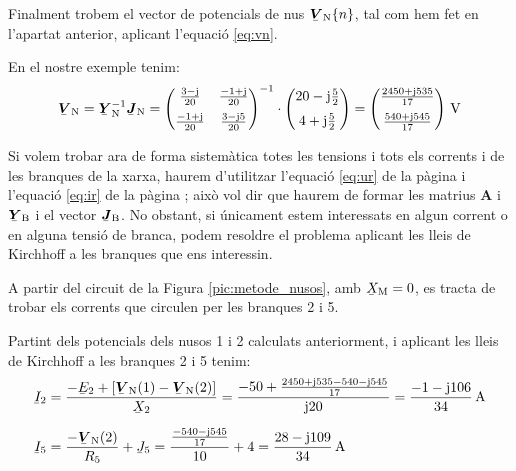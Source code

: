 Finalment
trobem el vector de potencials de nus $\mcmplx{V}\ped{N}\{n\}$, tal
com  hem fet en l'apartat anterior, aplicant l'equació \eqref{eq:vn}.

En el nostre exemple tenim:
\[
   \mcmplx{V}\ped{N} = \mcmplx{Y}\ped{N}^{-1} \mcmplx{J}\ped{N} =
   \begin{pmatrix}
         \frac{3 - \ju}{20}  & \frac{-1 + \ju}{20} \\[2mm]
         \frac{-1 + \ju}{20} & \frac{3 - \ju 5}{20}
   \end{pmatrix} ^{-1} \cdot
   \begin{pmatrix}
            20 - \ju \frac{5}{2} \\[2mm]
            4 + \ju \frac{5}{2}
   \end{pmatrix} =
   \begin{pmatrix}
         \frac{2450 + \ju 535}{17} \\[2mm]
         \frac{540  + \ju 545}{17}
   \end{pmatrix}\unit{V}
\]

Si volem trobar ara de forma sistemàtica totes les tensions i tots
els corrents i  de les branques de la xarxa, haurem d'utilitzar
l'equació \eqref{eq:ur} de la pàgina \pageref{eq:ur} i l'equació
\eqref{eq:ir} de la pàgina \pageref{eq:ir}; això vol dir que haurem
de formar les matrius $\boldsymbol{A}$ i $\mcmplx{Y}\ped{B}$ i el
vector $\mcmplx{J}\ped{B}$. No obstant, si únicament estem
interessats en algun corrent o en alguna tensió de branca, podem
resoldre el problema aplicant les lleis de Kirchhoff a les branques
que ens interessin.


\begin{exemple}
    A partir del circuit de la Figura \vref{pic:metode_nusos}, amb
    $\cmplx{X}\ped{M}=0$, es tracta de trobar els corrents que circulen
    per les branques 2 i 5.

    Partint dels potencials dels nusos 1 i 2 calculats anteriorment, i
    aplicant les lleis de Kirchhoff a les branques 2 i 5 tenim:
    \begin{align*}
       \cmplx{I}_2 &= \frac{-\cmplx{E}_2 + [\mcmplx{V}\ped{N}(1) - \mcmplx{V}\ped{N}(2)]}
                      {\cmplx{X}_2} = \frac{-50 + \frac{2450+\ju 535 -540
                      - \ju 545}{17}} {\ju 20} = \frac{-1 - \ju 106}{34}\unit{A} \\[1.5ex]
       \cmplx{I}_5 &=  \frac{- \mcmplx{V}\ped{N}(2)}{R_5}  + \cmplx{J}_5 =
                      \frac{\frac{-540 - \ju 545}{17}}{10} + 4 =
                      \frac{28 - \ju 109}{34}\unit{A}
    \end{align*}
\end{exemple}

